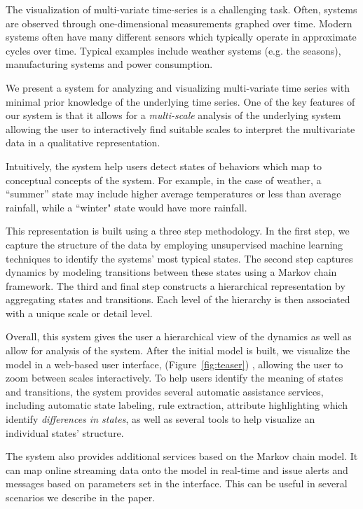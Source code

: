 The visualization of multi-variate time-series is a challenging task. Often, systems are observed through one-dimensional measurements graphed over time. Modern systems often have many different sensors which 
typically operate in approximate cycles over time. Typical examples include weather systems (e.g. the seasons), manufacturing systems and power consumption. 

We present a system for analyzing and visualizing multi-variate time series with minimal prior knowledge of the underlying time series. One of the key features of our system is that it allows for a \emph{multi-scale} analysis of the underlying system allowing the user to interactively find suitable scales to interpret the multivariate data in a qualitative representation.  

Intuitively, the system help users detect states of behaviors which map to conceptual concepts of the system. For example, in the case of weather, a ``summer'' state may include higher average temperatures or less than average rainfall, while a ``winter" state would have more rainfall. 

This representation is built using a three step methodology. In the first
step, we capture the structure of the data by employing unsupervised machine learning
techniques to identify the systems' most typical states. The second step captures
dynamics by modeling transitions between these states using a Markov chain framework.
The third and final step constructs a hierarchical representation by aggregating
states and transitions. Each level of the hierarchy is then associated with a unique
scale or detail level.

Overall, this system gives the user a hierarchical view of the dynamics as well as 
allow for analysis of the system. After the initial model is built, we visualize the model
in a web-based user interface, (Figure~\ref{fig:teaser}) , allowing the 
user to zoom between scales interactively. To help users identify the
meaning of states and transitions, the system provides several automatic assistance services,
including automatic state labeling, rule extraction, attribute highlighting which
identify \emph{differences in states}, as well as several tools to help visualize an individual states'
structure. 

The system also provides additional services based on the Markov chain model. It can map online streaming data onto 
the model in real-time and issue alerts and messages based on parameters set in the interface. This can be useful in several scenarios we describe in the paper.

